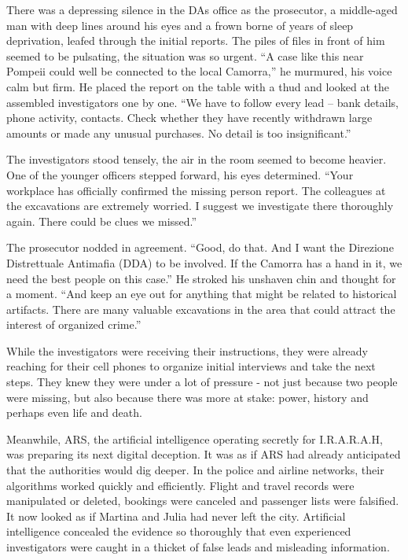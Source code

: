 \documentclass[
]{article}
\begin{document}
There was a depressing silence in the DA\textquotesingle s office as the
prosecutor, a middle-aged man with deep lines around his eyes and a
frown borne of years of sleep deprivation, leafed through the initial
reports. The piles of files in front of him seemed to be pulsating, the
situation was so urgent. ``A case like this near Pompeii could well be
connected to the local Camorra,'' he murmured, his voice calm but firm.
He placed the report on the table with a thud and looked at the
assembled investigators one by one. ``We have to follow every lead --
bank details, phone activity, contacts. Check whether they have recently
withdrawn large amounts or made any unusual purchases. No detail is too
insignificant.''

The investigators stood tensely, the air in the room seemed to become
heavier. One of the younger officers stepped forward, his eyes
determined. ``Your workplace has officially confirmed the missing person
report. The colleagues at the excavations are extremely worried. I
suggest we investigate there thoroughly again. There could be clues we
missed.''

The prosecutor nodded in agreement. ``Good, do that. And I want the
Direzione Distrettuale Antimafia (DDA) to be involved. If the Camorra
has a hand in it, we need the best people on this case.'' He stroked his
unshaven chin and thought for a moment. ``And keep an eye out for
anything that might be related to historical artifacts. There are many
valuable excavations in the area that could attract the interest of
organized crime.''

While the investigators were receiving their instructions, they were
already reaching for their cell phones to organize initial interviews
and take the next steps. They knew they were under a lot of pressure -
not just because two people were missing, but also because there was
more at stake: power, history and perhaps even life and death.

Meanwhile, ARS, the artificial intelligence operating secretly for
I.R.A.R.A.H, was preparing its next digital deception. It was as if ARS
had already anticipated that the authorities would dig deeper. In the
police and airline networks, their algorithms worked quickly and
efficiently. Flight and travel records were manipulated or deleted,
bookings were canceled and passenger lists were falsified. It now looked
as if Martina and Julia had never left the city. Artificial intelligence
concealed the evidence so thoroughly that even experienced investigators
were caught in a thicket of false leads and misleading information.
\end{document}
